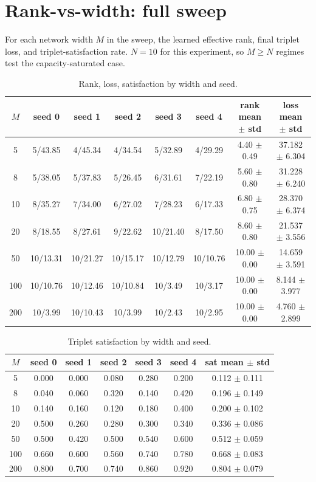 \section{Rank-vs-width: full sweep}
\label{app:rank-width}

For each network width $M$ in the sweep, the learned effective rank, final triplet loss, and triplet-satisfaction rate. $N = 10$ for this experiment, so $M \ge N$ regimes test the capacity-saturated case.

\begin{table}[H]
\centering
\caption{Rank, loss, satisfaction by width and seed.}
\label{tab:rank-width-perseed}
\begin{tabular}{c | c c c c c | c c}
\toprule
$M$ & seed 0 & seed 1 & seed 2 & seed 3 & seed 4 & rank mean $\pm$ std & loss mean $\pm$ std \\
\midrule
5 & 5/43.85 & 4/45.34 & 4/34.54 & 5/32.89 & 4/29.29 & 4.40 $\pm$ 0.49 & 37.182 $\pm$ 6.304 \\
8 & 5/38.05 & 5/37.83 & 5/26.45 & 6/31.61 & 7/22.19 & 5.60 $\pm$ 0.80 & 31.228 $\pm$ 6.240 \\
10 & 8/35.27 & 7/34.00 & 6/27.02 & 7/28.23 & 6/17.33 & 6.80 $\pm$ 0.75 & 28.370 $\pm$ 6.374 \\
20 & 8/18.55 & 8/27.61 & 9/22.62 & 10/21.40 & 8/17.50 & 8.60 $\pm$ 0.80 & 21.537 $\pm$ 3.556 \\
50 & 10/13.31 & 10/21.27 & 10/15.17 & 10/12.79 & 10/10.76 & 10.00 $\pm$ 0.00 & 14.659 $\pm$ 3.591 \\
100 & 10/10.76 & 10/12.46 & 10/10.84 & 10/3.49 & 10/3.17 & 10.00 $\pm$ 0.00 & 8.144 $\pm$ 3.977 \\
200 & 10/3.99 & 10/10.43 & 10/3.99 & 10/2.43 & 10/2.95 & 10.00 $\pm$ 0.00 & 4.760 $\pm$ 2.899 \\
\bottomrule
\end{tabular}
\end{table}

\begin{table}[H]
\centering
\caption{Triplet satisfaction by width and seed.}
\label{tab:rank-width-sat}
\begin{tabular}{c | c c c c c | c}
\toprule
$M$ & seed 0 & seed 1 & seed 2 & seed 3 & seed 4 & sat mean $\pm$ std \\
\midrule
5 & 0.000 & 0.000 & 0.080 & 0.280 & 0.200 & 0.112 $\pm$ 0.111 \\
8 & 0.040 & 0.060 & 0.320 & 0.140 & 0.420 & 0.196 $\pm$ 0.149 \\
10 & 0.140 & 0.160 & 0.120 & 0.180 & 0.400 & 0.200 $\pm$ 0.102 \\
20 & 0.500 & 0.260 & 0.280 & 0.300 & 0.340 & 0.336 $\pm$ 0.086 \\
50 & 0.500 & 0.420 & 0.500 & 0.540 & 0.600 & 0.512 $\pm$ 0.059 \\
100 & 0.660 & 0.600 & 0.560 & 0.740 & 0.780 & 0.668 $\pm$ 0.083 \\
200 & 0.800 & 0.700 & 0.740 & 0.860 & 0.920 & 0.804 $\pm$ 0.079 \\
\bottomrule
\end{tabular}
\end{table}
